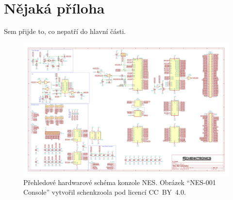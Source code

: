 \chapter{Nějaká příloha}


Sem přijde to, co nepatří do hlavní části.

\begin{figure}[p!]
	\centering
	\caption{Přehledové hardwarové schéma konzole NES. Obrázek \enquote{NES-001 Console} vytvořil schenkzoola pod licencí CC~BY~4.0.}
	\label{fig:nes001-hw}
	\includegraphics[width=0.95\textheight, angle=270]{images/NES-001.pdf}
\end{figure}